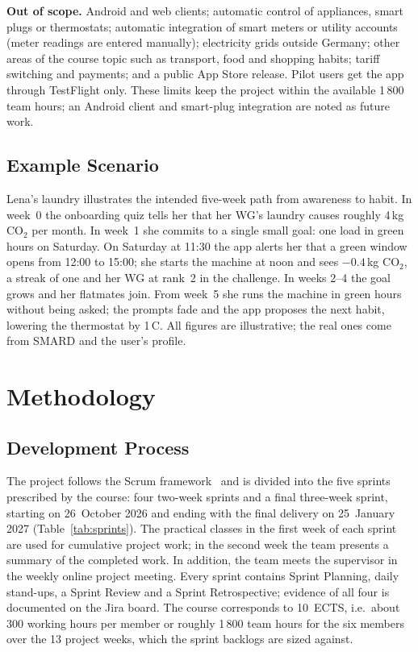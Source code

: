 \documentclass[conference]{IEEEtran}
\newcommand{\COtwo}{CO$_2$}
\begin{document}
\textbf{Out of scope.} Android and web clients; automatic control of appliances, smart plugs or thermostats; automatic integration of smart meters or utility accounts (meter readings are entered manually); electricity grids outside Germany; other areas of the course topic such as transport, food and shopping habits; tariff switching and payments; and a public App Store release. Pilot users get the app through TestFlight only. These limits keep the project within the available 1\,800 team hours; an Android client and smart-plug integration are noted as future work.

\subsection{Example Scenario}
Lena's laundry illustrates the intended five-week path from awareness to habit. In week~0 the onboarding quiz tells her that her WG's laundry causes roughly 4\,kg \COtwo{} per month. In week~1 she commits to a single small goal: one load in green hours on Saturday. On Saturday at 11:30 the app alerts her that a green window opens from 12:00 to 15:00; she starts the machine at noon and sees $-0.4$\,kg \COtwo{}, a streak of one and her WG at rank~2 in the challenge. In weeks 2--4 the goal grows and her flatmates join. From week~5 she runs the machine in green hours without being asked; the prompts fade and the app proposes the next habit, lowering the thermostat by 1\,\textdegree C. All figures are illustrative; the real ones come from SMARD and the user's profile.

\section{Methodology}
\label{sec:method}

\subsection{Development Process}
The project follows the Scrum framework~\cite{scrumguide} and is divided into the five sprints prescribed by the course: four two-week sprints and a final three-week sprint, starting on 26~October 2026 and ending with the final delivery on 25~January 2027 (Table~\ref{tab:sprints}). The practical classes in the first week of each sprint are used for cumulative project work; in the second week the team presents a summary of the completed work. In addition, the team meets the supervisor in the weekly online project meeting. Every sprint contains Sprint Planning, daily stand-ups, a Sprint Review and a Sprint Retrospective; evidence of all four is documented on the Jira board. The course corresponds to 10~ECTS, i.e.\ about 300 working hours per member or roughly 1\,800 team hours for the six members over the 13 project weeks, which the sprint backlogs are sized against.
\end{document}
